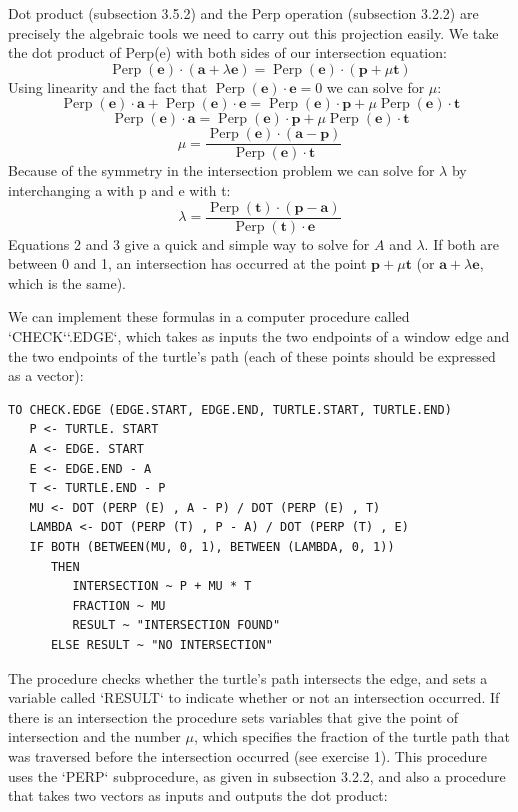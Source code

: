 \documentclass{book}
\begin{document}
Dot product (subsection 3.5.2) and the Perp operation (subsection
3.2.2) are precisely the algebraic tools we need to carry out this projection easily. We take the dot product of Perp(e) with both sides of our
intersection equation:
$$\operatorname{Perp}(\mathbf{e}) \cdot (\mathbf{a} + \lambda \mathbf{e})= \operatorname{Perp}(\mathbf{e}) \cdot (\mathbf{p} + \mu \mathbf{t})$$
Using linearity and the fact that $\operatorname{Perp}(\mathbf{e}) \cdot \mathbf{e} = 0$ we can solve for $\mu$:
$$\operatorname{Perp}(\mathbf{e}) \cdot \mathbf{a} + \operatorname{Perp}(\mathbf{e}) \cdot \mathbf{e} = \operatorname{Perp}(\mathbf{e}) \cdot \mathbf{p} + \mu \operatorname{Perp}(\mathbf{e}) \cdot \mathbf{t}$$
$$\operatorname{Perp}(\mathbf{e}) \cdot \mathbf{a} = \operatorname{Perp}(\mathbf{e}) \cdot \mathbf{p} + \mu \operatorname{Perp}(\mathbf{e}) \cdot \mathbf{t}$$
$$ \mu = \frac{\operatorname{Perp}(\mathbf{e})\cdot(\mathbf{a} - \mathbf{p})}{\operatorname{Perp}(\mathbf{e}) \cdot \mathbf{t}}$$
Because of the symmetry in the intersection problem we can solve for $\lambda$
by interchanging a with p and e with t:
$$ \lambda = \frac{\operatorname{Perp}(\mathbf{t}) \cdot (\mathbf{p} - \mathbf{a})}{\operatorname{Perp}(\mathbf{t}) \cdot \mathbf{e}} $$
Equations 2 and 3 give a quick and simple way to solve for $A$ and $\lambda$.
If both are between 0 and 1, an intersection has occurred at the point
$\mathbf{p} + \mu \mathbf{t}$ (or $\mathbf{a} + \lambda \mathbf{e}$, which is the same).

We can implement these formulas in a computer procedure called
\textsc{`CHECK`}\textsc{`.EDGE`}, which takes as inputs the two endpoints of a window edge
and the two endpoints of the turtle's path (each of these points should
be expressed as a vector):

\begin{verbatim}
TO CHECK.EDGE (EDGE.START, EDGE.END, TURTLE.START, TURTLE.END)
   P <- TURTLE. START
   A <- EDGE. START
   E <- EDGE.END - A
   T <- TURTLE.END - P
   MU <- DOT (PERP (E) , A - P) / DOT (PERP (E) , T)
   LAMBDA <- DOT (PERP (T) , P - A) / DOT (PERP (T) , E)
   IF BOTH (BETWEEN(MU, 0, 1), BETWEEN (LAMBDA, 0, 1))
      THEN
         INTERSECTION ~ P + MU * T
         FRACTION ~ MU
         RESULT ~ "INTERSECTION FOUND"
      ELSE RESULT ~ "NO INTERSECTION"
\end{verbatim}
The procedure checks whether the turtle's path intersects the edge, and
sets a variable called \textsc{`RESULT`} to indicate whether or not an intersection
occurred. If there is an intersection the procedure sets variables that give
the point of intersection and the number $\mu$, which specifies the fraction
of the turtle path that was traversed before the intersection occurred
(see exercise 1). This procedure uses the \textsc{`PERP`} subprocedure, as given in
subsection 3.2.2, and also a procedure that takes two vectors as inputs
and outputs the dot product:
\end{document}
